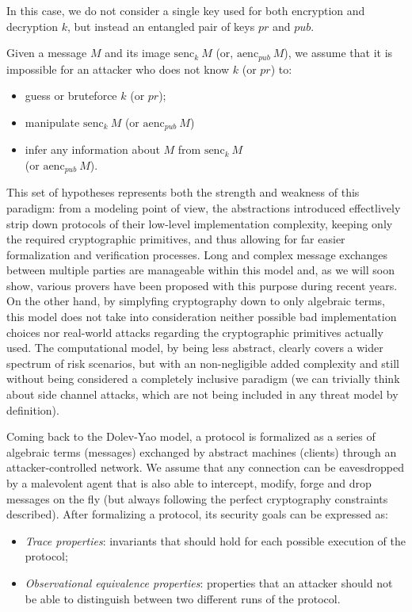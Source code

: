 \documentclass{article}
\newcounter{definition}[section]\setcounter{definition}{0}
\begin{document}
In this case, we do not consider a single key used for both encryption and decryption $k$, but instead an entangled pair of keys $pr$ and $pub$.

Given a message $M$ and its image $\textrm{senc}_k\ M$ (or, $\textrm{aenc}_{pub}\ M$), we assume that it is impossible for an attacker who does not know $k$ (or $pr$) to:

\begin{itemize}
    \item guess or bruteforce $k$ (or $pr$);
    \item manipulate $\textrm{senc}_k\ M$ (or $\textrm{aenc}_{pub}\ M$)
    \item infer any information about $M$ from $\textrm{senc}_k\ M$ \\(or $\textrm{aenc}_{pub}\ M$).
\end{itemize}

This set of hypotheses represents both the strength and weakness of this paradigm: from a modeling point of view, the abstractions introduced effectlively strip down protocols of their low-level implementation complexity, keeping only the required cryptographic primitives, and thus allowing for far easier formalization and verification processes. Long and complex message exchanges between multiple parties are manageable within this model and, as we will soon show, various provers have been proposed with this purpose during recent years. On the other hand, by simplyfing cryptography down to only algebraic terms, this model does not take into consideration neither possible bad implementation choices nor real-world attacks regarding the cryptographic primitives actually used. The computational model, by being less abstract, clearly covers a wider spectrum of risk scenarios, but with an non-negligible added complexity and still without being considered a completely inclusive paradigm (we can trivially think about side channel attacks, which are not being included in any threat model by definition).

Coming back to the Dolev-Yao model, a protocol is formalized as a series of algebraic terms (messages) exchanged by abstract machines (clients) through an attacker-controlled network. We assume that any connection can be eavesdropped by a malevolent agent that is also able to intercept, modify, forge and drop messages on the fly (but always following the perfect cryptography constraints described). After formalizing a protocol, its security goals can be expressed as:

\begin{itemize}
    \item \textit{Trace properties}: invariants that should hold for each possible execution of the protocol;
    \item \textit{Observational equivalence properties}: properties that an attacker should not be able to distinguish between two different runs of the protocol.
\end{itemize}
\end{document}
